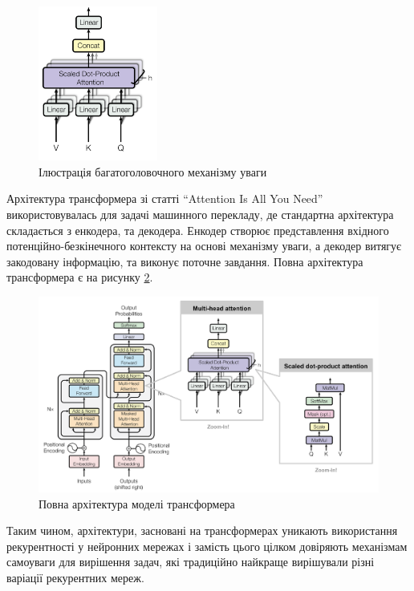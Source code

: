 \documentclass[a4paper,14pt]{extreport}
\begin{document}
\begin{figure}[H]
    \centering
    \includegraphics[width=0.35\textwidth]{multi-head-attention.png}
    \caption{Ілюстрація багатоголовочного механізму уваги}
    \label{fig:trans-multihead}
\end{figure}

Архітектура трансформера зі статті ``Attention Is All You Need''
використовувалась для задачі машинного перекладу, де
стандартна архітектура складається з енкодера, та декодера.
Енкодер створює представлення вхідного
потенційно-безкінечного контексту
на основі механізму уваги, а декодер витягує закодовану інформацію,
та виконує поточне завдання. Повна архітектура трансформера
є на рисунку \ref{fig:trans-arch}.

\begin{figure}[H]
    \centering
    \includegraphics[width=1\textwidth]{transformer.png}
    \caption{Повна архітектура моделі трансформера}
    \label{fig:trans-arch}
\end{figure}

Таким чином, архітектури, засновані на трансформерах
уникають використання рекурентності у нейронних мережах і замість
цього цілком довіряють механізмам самоуваги для
вирішення задач, які традиційно найкраще вирішували
різні варіації рекурентних мереж.
\end{document}
